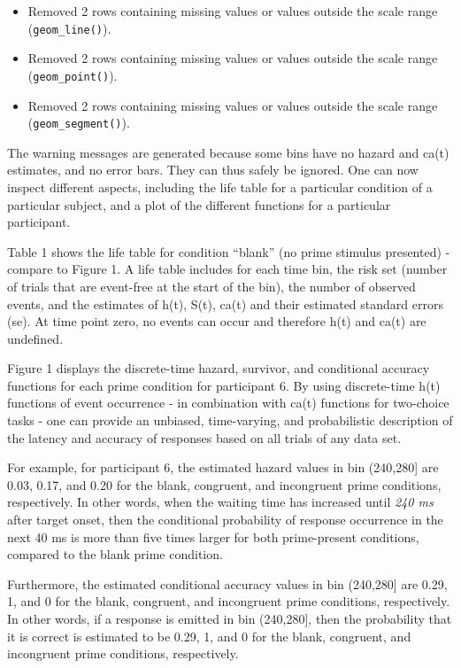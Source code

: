 \documentclass[
  man,floatsintext]{apa6}
\providecommand{\tightlist}{%
  \setlength{\itemsep}{0pt}\setlength{\parskip}{0pt}}
\begin{document}
\begin{itemize}
\tightlist
\item
  Removed 2 rows containing missing values or values outside the scale range (\texttt{geom\_line()}).
\item
  Removed 2 rows containing missing values or values outside the scale range (\texttt{geom\_point()}).
\item
  Removed 2 rows containing missing values or values outside the scale range (\texttt{geom\_segment()}).
\end{itemize}

The warning messages are generated because some bins have no hazard and ca(t) estimates, and no error bars. They can thus safely be ignored.
One can now inspect different aspects, including the life table for a particular condition of a particular subject, and a plot of the different functions for a particular participant.

Table 1 shows the life table for condition ``blank'' (no prime stimulus presented) - compare to Figure 1. A life table includes for each time bin, the risk set (number of trials that are event-free at the start of the bin), the number of observed events, and the estimates of h(t), S(t), ca(t) and their estimated standard errors (se). At time point zero, no events can occur and therefore h(t) and ca(t) are undefined.

Figure 1 displays the discrete-time hazard, survivor, and conditional accuracy functions for each prime condition for participant 6. By using discrete-time h(t) functions of event occurrence - in combination with ca(t) functions for two-choice tasks - one can provide an unbiased, time-varying, and probabilistic description of the latency and accuracy of responses based on all trials of any data set.

For example, for participant 6, the estimated hazard values in bin (240,280{]} are 0.03, 0.17, and 0.20 for the blank, congruent, and incongruent prime conditions, respectively. In other words, when the waiting time has increased until \emph{240 ms} after target onset, then the conditional probability of response occurrence in the next 40 ms is more than five times larger for both prime-present conditions, compared to the blank prime condition.

Furthermore, the estimated conditional accuracy values in bin (240,280{]} are 0.29, 1, and 0 for the blank, congruent, and incongruent prime conditions, respectively. In other words, if a response is emitted in bin (240,280{]}, then the probability that it is correct is estimated to be 0.29, 1, and 0 for the blank, congruent, and incongruent prime conditions, respectively.
\end{document}
